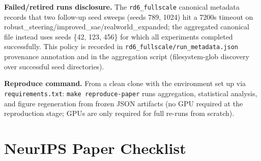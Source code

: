 \documentclass{article}
\begin{document}
\textbf{Failed/retired runs disclosure.} The \texttt{rd6\_fullscale} canonical metadata records that two follow-up seed sweeps (seeds 789, 1024) hit a 7200s timeout on robust\_steering/improved\_sae/realworld\_expanded; the aggregated canonical file instead uses seeds \{42, 123, 456\} for which all experiments completed successfully. This policy is recorded in \texttt{rd6\_fullscale/run\_metadata.json} provenance annotation and in the aggregation script (filesystem-glob discovery over successful seed directories).

\textbf{Reproduce command.} From a clean clone with the environment set up via \texttt{requirements.txt}: \texttt{make reproduce-paper} runs aggregation, statistical analysis, and figure regeneration from frozen JSON artifacts (no GPU required at the reproduction stage; GPUs are only required for full re-runs from scratch).

\newpage
\section*{NeurIPS Paper Checklist}
\end{document}
